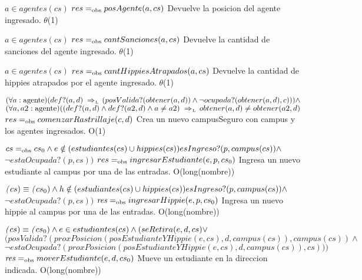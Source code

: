  {$a \in agentes(cs)$}
 {$res =_{\mathrm{obs}} posAgente(a, cs)$}
 {Devuelve la posicion del agente ingresado.}
 {$\theta$(1)}
 {}
 
 {$a \in agentes(cs)$}
 {$res =_{\mathrm{obs}} cantSanciones(a, cs)$}
 {Devuelve la cantidad de sanciones del agente ingresado.}
 {$\theta$(1)}
 {}
 
 {$a \in agentes(cs)$}
 {$res =_{\mathrm{obs}} cantHippiesAtrapados(a, cs)$}
 {Devuelve la cantidad de hippies atrapados por el agente ingresado.}
 {$\theta$(1)}
 {}
 

{$(\paratodo{agente}{a})(def?(a, d) \impluego (posValida?(obtener(a, d)) \land \neg ocupada?(obtener(a, d), c))) \land $\\$ (\paratodo{agente}{a, a2}) ((def?(a, d) \land def?(a2, d) \land a \neq a2) \impluego obtener(a, d) \neq obtener(a2, d)$}
{$res =_{\mathrm{obs}} comenzarRastrillaje(c, d)$}
{Crea un nuevo campusSeguro con campus y los agentes ingresados.}
{O($1$)}
{}
 
{$cs =_{\mathrm{obs}} cs_0 \land e \notin (estudiantes(cs) \cup hippies(cs)) esIngreso?(p, campus(cs)) \land $\\$\neg estaOcupada?(p, cs))$}
{$res =_{\mathrm{obs}} ingresarEstudiante(e, p, cs_0)$}
{Ingresa un nuevo estudiante al campus por una de las entradas.}
{O(long(nombre))}
{}

{$\text{\textit{(}}cs) \equiv \text{\textit{(}}cs_0) \land h \notin (estudiantes(cs) \cup hippies(cs)) esIngreso?(p, campus(cs)) \land $\\$\neg estaOcupada?(p, cs))$}
{$\text{\textit{res}} =_{\mathrm{obs}} ingresarHippie(e, p, cs_0)$}
{Ingresa un nuevo hippie al campus por una de las entradas.}
{O(long(nombre))}
{}

{$\text{\textit{(}}cs) \equiv \text{\textit{(}}cs_0) \land e \in estudiantes(cs) \land (seRetira(e, d, cs) \lor $\\$ (posValida?(proxPosicion(posEstudianteYHippie(e, cs), d, campus(cs)), campus(cs)) \land $\\$ \neg estaOcupada?(proxPosicion(posEstudianteYHippie(e, cs), d, campus(cs)), cs)))$}
{$\text{\textit{res}} =_{\mathrm{obs}} moverEstudiante(e, d, cs_0)$}
{Mueve un estudiante en la direccion indicada.}
{O(long(nombre))}
{}

